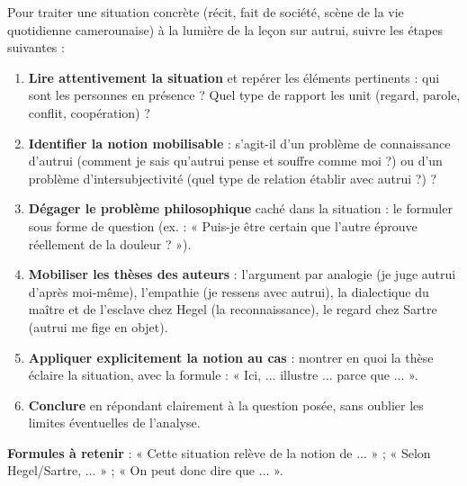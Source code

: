 \documentclass[11pt]{article}
\newcommand{\cle}[1]{{\popxbold\color{popdark}#1}}
\begin{document}
\begin{methode}
Pour traiter une situation concrète (récit, fait de société, scène de la vie quotidienne camerounaise) à la lumière de la leçon sur autrui, suivre les étapes suivantes :
\begin{enumerate}
\item \textbf{Lire attentivement la situation} et repérer les éléments pertinents : qui sont les personnes en présence ? Quel type de rapport les unit (regard, parole, conflit, coopération) ?
\item \textbf{Identifier la notion mobilisable} : s'agit-il d'un problème de \cle{connaissance d'autrui} (comment je sais qu'autrui pense et souffre comme moi ?) ou d'un problème d'\cle{intersubjectivité} (quel type de relation établir avec autrui ?) ?
\item \textbf{Dégager le problème philosophique} caché dans la situation : le formuler sous forme de question (ex. : « Puis-je être certain que l'autre éprouve réellement de la douleur ? »).
\item \textbf{Mobiliser les thèses des auteurs} : l'argument par \cle{analogie} (je juge autrui d'après moi-même), l'\cle{empathie} (je ressens avec autrui), la dialectique du \cle{maître et de l'esclave} chez Hegel (la reconnaissance), le \cle{regard} chez Sartre (autrui me fige en objet).
\item \textbf{Appliquer explicitement la notion au cas} : montrer en quoi la thèse éclaire la situation, avec la formule : « Ici, ... illustre ... parce que ... ».
\item \textbf{Conclure} en répondant clairement à la question posée, sans oublier les limites éventuelles de l'analyse.
\end{enumerate}
\textbf{Formules à retenir} : « Cette situation relève de la notion de ... » ; « Selon Hegel/Sartre, ... » ; « On peut donc dire que ... ».
\end{methode}
\end{document}
